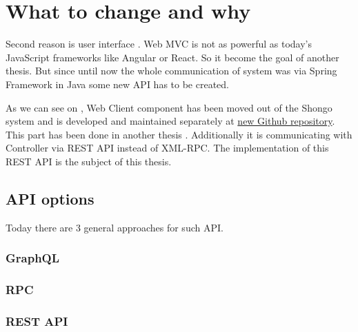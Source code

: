 \chapter{What to change and why}

Second reason is user interface . Web MVC is not as powerful as today's JavaScript frameworks like Angular or React.
So it become the goal of another thesis. \cite{drobnakm}
But since until now the whole communication of system was via Spring Framework in Java some new API has to be created.


As we can see on , Web Client component has been moved out of the Shongo system and is developed and maintained separately at \href{https://github.com/shongo/shongo-frontend}{new Github repository}. This part has been done in another thesis \cite{drobnakm}.
Additionally it is communicating with Controller via REST API instead of XML-RPC. The implementation of this REST API is the subject of this thesis.

\section{API options}
Today there are 3 general approaches for such API.
\subsection{GraphQL}
\subsection{RPC}
\subsection{REST API}
